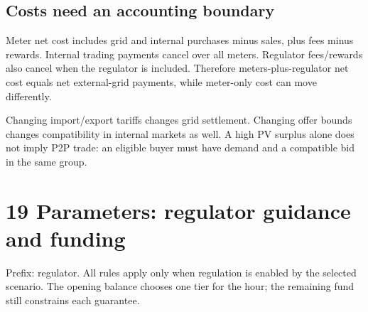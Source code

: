 \documentclass[a4paper,11pt]{article}
\begin{document}
\subsection*{Costs need an accounting boundary}
\par\medskip

Meter net cost includes grid and internal purchases minus sales, plus fees minus rewards. Internal trading payments cancel over all meters. Regulator fees/rewards also cancel when the regulator is included. Therefore meters-plus-regulator net cost equals net external-grid payments, while meter-only cost can move differently.
\par\medskip

Changing import/export tariffs changes grid settlement. Changing offer bounds changes compatibility in internal markets as well. A high PV surplus alone does not imply P2P trade: an eligible buyer must have demand and a compatible bid in the same group.
\par\medskip

\clearpage

\section*{19  Parameters: regulator guidance and funding}
\par\medskip

Prefix: regulator. All rules apply only when regulation is enabled by the selected scenario. The opening balance chooses one tier for the hour; the remaining fund still constrains each guarantee.
\par\medskip
\end{document}
